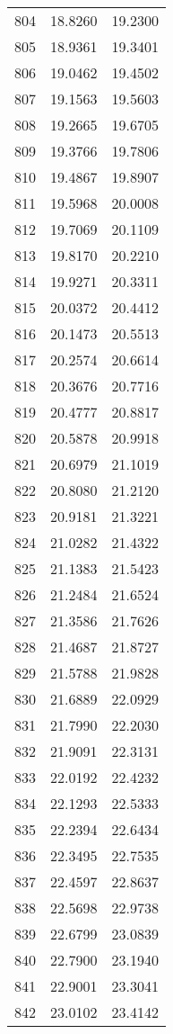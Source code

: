 \documentclass{article}
\begin{document}
\begin{longtable}{|c|c|c|}
804 & 18.8260 & 19.2300 \\
805 & 18.9361 & 19.3401 \\
806 & 19.0462 & 19.4502 \\
807 & 19.1563 & 19.5603 \\
808 & 19.2665 & 19.6705 \\
809 & 19.3766 & 19.7806 \\
810 & 19.4867 & 19.8907 \\
811 & 19.5968 & 20.0008 \\
812 & 19.7069 & 20.1109 \\
813 & 19.8170 & 20.2210 \\
814 & 19.9271 & 20.3311 \\
815 & 20.0372 & 20.4412 \\
816 & 20.1473 & 20.5513 \\
817 & 20.2574 & 20.6614 \\
818 & 20.3676 & 20.7716 \\
819 & 20.4777 & 20.8817 \\
820 & 20.5878 & 20.9918 \\
821 & 20.6979 & 21.1019 \\
822 & 20.8080 & 21.2120 \\
823 & 20.9181 & 21.3221 \\
824 & 21.0282 & 21.4322 \\
825 & 21.1383 & 21.5423 \\
826 & 21.2484 & 21.6524 \\
827 & 21.3586 & 21.7626 \\
828 & 21.4687 & 21.8727 \\
829 & 21.5788 & 21.9828 \\
830 & 21.6889 & 22.0929 \\
831 & 21.7990 & 22.2030 \\
832 & 21.9091 & 22.3131 \\
833 & 22.0192 & 22.4232 \\
834 & 22.1293 & 22.5333 \\
835 & 22.2394 & 22.6434 \\
836 & 22.3495 & 22.7535 \\
837 & 22.4597 & 22.8637 \\
838 & 22.5698 & 22.9738 \\
839 & 22.6799 & 23.0839 \\
840 & 22.7900 & 23.1940 \\
841 & 22.9001 & 23.3041 \\
842 & 23.0102 & 23.4142 \\

\end{longtable}
\end{document}
